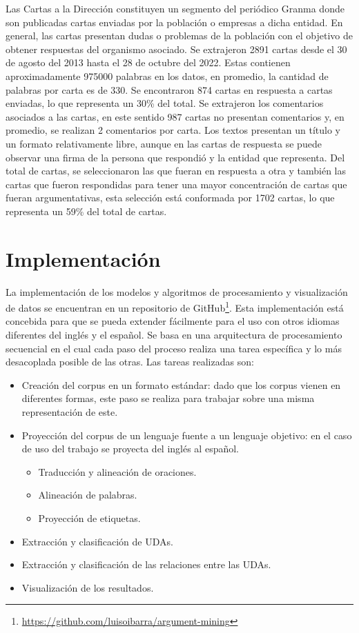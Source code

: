 \documentclass[a4paper,11pt,twocolumn,twoside]{article}
\begin{document}
Las Cartas a la Dirección constituyen un segmento del periódico Granma donde son publicadas
cartas enviadas por la población o empresas a dicha entidad. En general, las cartas 
presentan dudas o problemas de la población con el objetivo de obtener respuestas del organismo
asociado. Se extrajeron 2891 cartas desde el 30 de agosto del 2013 hasta el 28 de octubre del 2022. Estas 
contienen aproximadamente 975000 palabras en los datos, en promedio, la cantidad de palabras por carta es de 330.
Se encontraron 874 cartas en respuesta a cartas enviadas, lo que representa un 30\% del total. Se extrajeron
los comentarios asociados a las cartas, en este sentido 987 cartas no presentan comentarios y, en promedio, 
se realizan 2 comentarios por carta. Los textos presentan un título y un formato relativamente libre, 
aunque en las cartas de respuesta se puede observar una firma de la persona que respondió y la entidad que 
representa. Del total de cartas, se seleccionaron las que fueran en respuesta a otra y también las 
cartas que fueron respondidas para tener una mayor concentración de cartas que fueran argumentativas, 
esta selección está conformada por 1702 cartas, lo que representa un 59\% del total de cartas.

\section{Implementación}

La implementación de los modelos y algoritmos de procesamiento y visualización de datos se encuentran en 
un repositorio de GitHub\footnote{\url{https://github.com/luisoibarra/argument-mining}}. Esta implementación
está concebida para que se pueda extender fácilmente para el uso con otros idiomas diferentes del inglés y el 
español. Se basa en una arquitectura de procesamiento secuencial en el cual cada paso del proceso realiza
una tarea específica y lo más desacoplada posible de las otras. Las tareas realizadas son:

\begin{itemize}
	\item Creación del corpus en un formato estándar: dado que los corpus vienen en diferentes
	      formas, este paso se realiza para trabajar sobre una misma representación de este.
	\item Proyección del corpus de un lenguaje fuente a un lenguaje objetivo: en el caso de
	      uso del trabajo se proyecta del inglés al español.
	      \begin{itemize}
		      \item Traducción y alineación de oraciones.
		      \item Alineación de palabras.
		      \item Proyección de etiquetas.
	      \end{itemize}
	\item Extracción y clasificación de UDAs.
	\item Extracción y clasificación de las relaciones entre las UDAs.
	\item Visualización de los resultados.
\end{itemize}
\end{document}
